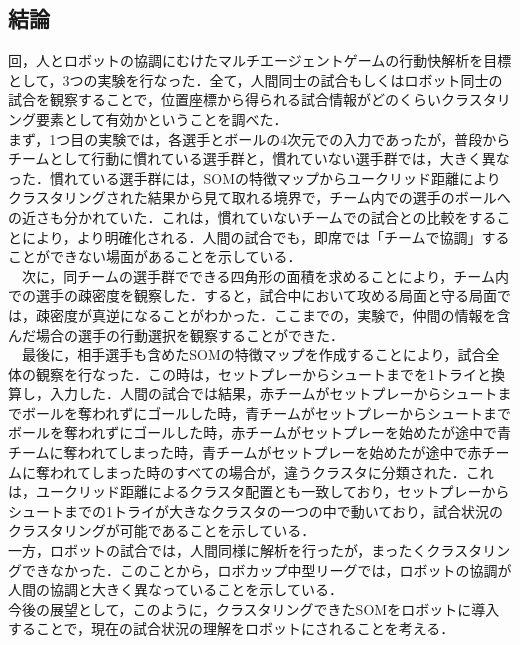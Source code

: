\subsection{結論}
回，人とロボットの協調にむけたマルチエージェントゲームの行動快解析を目標として，3つの実験を行なった．全て，人間同士の試合もしくはロボット同士の試合を観察することで，位置座標から得られる試合情報がどのくらいクラスタリング要素として有効かということを調べた．\\
 まず，1つ目の実験では，各選手とボールの4次元での入力であったが，普段からチームとして行動に慣れている選手群と，慣れていない選手群では，大きく異なった．慣れている選手群には，SOMの特徴マップからユークリッド距離によりクラスタリングされた結果から見て取れる境界で，チーム内での選手のボールへの近さも分かれていた．これは，慣れていないチームでの試合との比較をすることにより，より明確化される．人間の試合でも，即席では「チームで協調」することができない場面があることを示している．\\
　次に，同チームの選手群でできる四角形の面積を求めることにより，チーム内での選手の疎密度を観察した．すると，試合中において攻める局面と守る局面では，疎密度が真逆になることがわかった．ここまでの，実験で，仲間の情報を含んだ場合の選手の行動選択を観察することができた．\\
　最後に，相手選手も含めたSOMの特徴マップを作成することにより，試合全体の観察を行なった．この時は，セットプレーからシュートまでを1トライと換算し，入力した．人間の試合では結果，赤チームがセットプレーからシュートまでボールを奪われずにゴールした時，青チームがセットプレーからシュートまでボールを奪われずにゴールした時，赤チームがセットプレーを始めたが途中で青チームに奪われてしまった時，青チームがセットプレーを始めたが途中で赤チームに奪われてしまった時のすべての場合が，違うクラスタに分類された．これは，ユークリッド距離によるクラスタ配置とも一致しており，セットプレーからシュートまでの1トライが大きなクラスタの一つの中で動いており，試合状況のクラスタリングが可能であることを示している．\\
  一方，ロボットの試合では，人間同様に解析を行ったが，まったくクラスタリングできなかった．このことから，ロボカップ中型リーグでは，ロボットの協調が人間の協調と大きく異なっていることを示している．\\
 今後の展望として，このように，クラスタリングできたSOMをロボットに導入することで，現在の試合状況の理解をロボットにされることを考える．




 






















